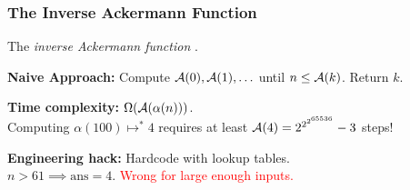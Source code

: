 \begin{frame}
\frametitle{The Inverse Ackermann Function}

The \emph{inverse Ackermann function}
.

%

\bigskip

\pause 
\textbf{Naive Approach:} Compute $\mathcal{A}(0), \mathcal{A}(1), \ldots$ until $n\le \mathcal{A}(k)$. Return $k$.

\bigskip

\textbf{Time complexity:} $\Omega(\mathcal{A}(\alpha(n)))$.
\\ Computing $\alpha(100) \mapsto^{*} 4$ requires at least
$\mathcal{A}(4) = 2^{2^{2^{65536}}} - 3$ steps!

\bigskip

\pause 
\textbf{Engineering hack:} Hardcode with lookup tables.
\\ $n > 61 \implies \text{ans} = 4$. \textcolor{red}{Wrong for large enough inputs.}

\bigskip

\pause 
{}
\end{frame}

